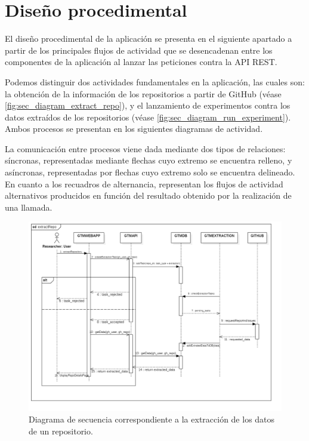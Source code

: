 \section{Diseño procedimental} \label{sec:proceduraldesign}

El diseño procedimental de la aplicación se presenta en el siguiente apartado a partir de los principales flujos de actividad que se desencadenan entre los componentes de la aplicación al lanzar las peticiones contra la API REST.

Podemos distinguir dos actividades fundamentales en la aplicación, las cuales son: la obtención de la información de los repositorios a partir de GitHub (véase \autoref{fig:sec_diagram_extract_repo}), y el lanzamiento de experimentos contra los datos extraídos de los repositorios (véase \autoref{fig:sec_diagram_run_experiment}). Ambos procesos se presentan en los siguientes diagramas de actividad. 

La comunicación entre procesos viene dada mediante dos tipos de relaciones: síncronas, representadas mediante flechas cuyo extremo se encuentra relleno, y asíncronas, representadas por flechas cuyo extremo solo se encuentra delineado. En cuanto a los recuadros de alternancia, representan los flujos de actividad alternativos producidos en función del resultado obtenido por la realización de una llamada.

\begin{figure}
	\centering
\includegraphics[width=\textwidth]{img/sec_diagram_extract_repo.png}
	\caption{Diagrama de secuencia correspondiente a la extracción de los datos de un repositorio.}
	\label{fig:sec_diagram_extract_repo}
\end{figure}


